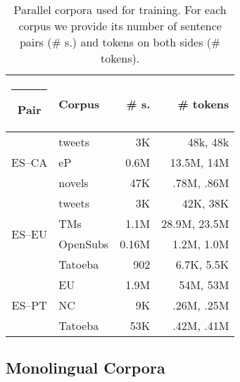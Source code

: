\documentclass[postprint]{flammie}
\begin{document}

    



{\small
\begin{table} [t]
\centering
\begin{tabular} {clrr}
  \hline\rule{-2pt}{15pt}
  \bf Pair & \bf Corpus & \bf \# s. & \bf \# tokens\\
  \hline
  \multirow{3}{*}{ES--CA} & tweets & 3K& 48k, 48k\\
  & eP & 0.6M & 13.5M, 14M \\
  & novels & 47K & .78M, .86M\\
  \hline

  \multirow{4}{*}{ES--EU} & tweets & 3K& 42K, 38K\\
  & TMs & 1.1M & 28.9M, 23.5M\\
  & OpenSubs & 0.16M &1.2M, 1.0M\\
  & Tatoeba & 902 &6.7K, 5.5K\\
  \hline

  \multirow{3}{*}{ES--PT} & EU & 1.9M& 54M, 53M\\
  & NC & 9K & .26M, .25M\\
  & Tatoeba & 53K& .42M, .41M\\
  \hline
\end{tabular}
\caption{\label{t:parallel_data}Parallel corpora used for training.
For each corpus we provide its number of sentence pairs (\# s.) and tokens on both sides (\# tokens).}
\end{table}
}





\subsection{\label{monolingualcorpora}Monolingual Corpora}
\end{document}
